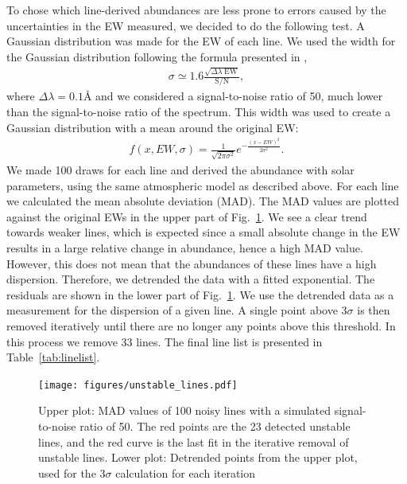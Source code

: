 \documentclass{aa}
\begin{document}
To chose which line-derived abundances are less prone to errors caused
by the uncertainties in the EW measured, we decided to do the following
test. A Gaussian distribution was made for the EW of each line. We used
the width for the Gaussian distribution following the formula presented
in \citet{Caryel1988},
\begin{align}
    \sigma \simeq 1.6 \frac{\sqrt{\Delta\lambda\; \mathrm{EW}}}{\mathrm{S/N}},
\end{align}
where $\Delta\lambda=0.1\si{\angstrom}$ and we considered a
signal-to-noise ratio of 50, much lower than the signal-to-noise ratio
of the spectrum. This width was used to create a Gaussian distribution
with a mean around the original EW:
\begin{align}
    f(x, EW, \sigma) = \frac{1}{\sqrt{2\pi\sigma^2}} e^{-\frac{(x-EW)^2}{2\sigma^2}}.
\end{align}
We made 100 draws for each line and derived the abundance with solar
parameters, using the same atmospheric model as described above.
For each line we calculated the mean absolute deviation (MAD). The
MAD values are plotted against the original EWs in the upper part
of Fig.~\ref{fig:unstable_lines}. We see a clear trend towards
weaker lines, which is expected since a small absolute change in
the EW results in a large relative change in abundance, hence a high
MAD value. However, this does not mean that the abundances of these
lines have a high dispersion. Therefore, we detrended the data with
a fitted exponential. The residuals are shown in the lower part
of Fig.~\ref{fig:unstable_lines}. We use the detrended data as a
measurement for the dispersion of a given line. A single point above $3
\sigma$ is then removed iteratively until there are no longer any points
above this threshold. In this process we remove 33 lines. The final line
list is presented in Table~\ref{tab:linelist}.

\begin{figure}[tbp!]
    \centering
    \texttt{[image: figures/unstable\_lines.pdf]}
    \caption{Upper plot: MAD values of 100 noisy lines
    with a simulated signal-to-noise ratio of 50. The red points are
    the 23 detected unstable lines, and the red curve is the last fit
    in the iterative removal of unstable lines. Lower plot: Detrended points from the upper plot, used for the $3\sigma$
    calculation for each iteration}
    \label{fig:unstable_lines}
\end{figure}
\end{document}
